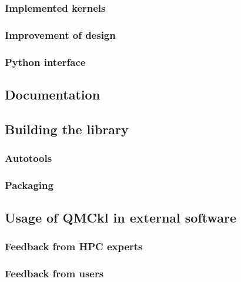 \subsubsection{Implemented kernels}

\subsubsection{Improvement of design}


\subsubsection{Python interface}


\subsection{Documentation}

\subsection{Building the library}

\subsubsection{Autotools}

\subsubsection{Packaging}

\subsection{Usage of QMCkl in external software}

\subsubsection{Feedback from HPC experts}

\subsubsection{Feedback from users}

